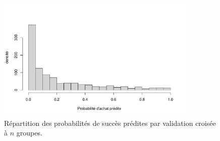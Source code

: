\documentclass[
  11pt,
  letterpaper,
]{scrbook}
\theoremstyle{definition}
\theoremstyle{remark}
\begin{document}
\begin{figure}[ht!]

{\centering \includegraphics[width=0.85\textwidth,height=\textheight]{./05-reglogistique_files/figure-pdf/fig-classification0-1.pdf}

}

\caption{\label{fig-classification0}Répartition des probabilités de
succès prédites par validation croisée à \(n\) groupes.}

\end{figure}
\end{document}
